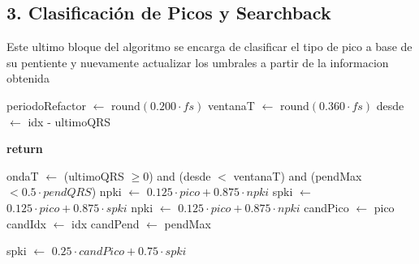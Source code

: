 \subsection{3. Clasificación de Picos y Searchback}
Este ultimo bloque del algoritmo se encarga de clasificar el tipo de pico a base de su pentiente y nuevamente actualizar los umbrales a partir de la informacion obtenida
\begin{algorithm}[H]
\caption{Clasificación de Picos y Searchback}
\begin{algorithmic}[1]
    \State periodoRefactor $\leftarrow$ $\text{round}(0.200 \cdot fs)$
    \State ventanaT $\leftarrow$ $\text{round}(0.360 \cdot fs)$
    \State desde $\leftarrow$ idx - ultimoQRS

        \State \textbf{return}
    \EndIf

        \State ondaT $\leftarrow$ (ultimoQRS $\geq 0$) and (desde $<$ ventanaT) and (pendMax $< 0.5 \cdot pendQRS$)
            \State npki $\leftarrow$ $0.125 \cdot pico + 0.875 \cdot npki$
        \Else
            \State spki $\leftarrow$ $0.125 \cdot pico + 0.875 \cdot spki$
            \State {}
        \EndIf
    \Else
        \State npki $\leftarrow$ $0.125 \cdot pico + 0.875 \cdot npki$
            \State candPico $\leftarrow$ pico
            \State candIdx $\leftarrow$ idx
            \State candPend $\leftarrow$ pendMax
        \EndIf
    \EndIf

    \State {}
\EndProcedure

        \State spki $\leftarrow$ $0.25 \cdot candPico + 0.75 \cdot spki$
        \State {}
        \State {}
    \EndIf
\EndProcedure
\end{algorithmic}
\end{algorithm}